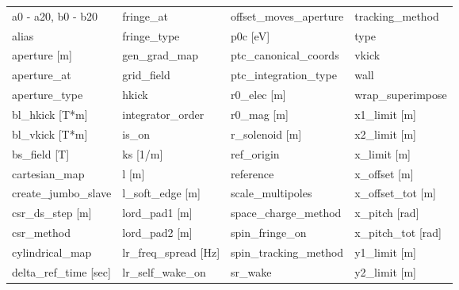  \begin{tabular}{llll} \toprule
a0 - a20, b0 - b20               & fringe_at                        & offset_moves_aperture            & tracking_method                  \\
alias                            & fringe_type                      & p0c [eV]                         & type                             \\
aperture [m]                     & gen_grad_map                     & ptc_canonical_coords             & vkick                            \\
aperture_at                      & grid_field                       & ptc_integration_type             & wall                             \\
aperture_type                    & hkick                            & r0_elec [m]                      & wrap_superimpose                 \\
bl_hkick [T*m]                   & integrator_order                 & r0_mag [m]                       & x1_limit [m]                     \\
bl_vkick [T*m]                   & is_on                            & r_solenoid [m]                   & x2_limit [m]                     \\
bs_field [T]                     & ks [1/m]                         & ref_origin                       & x_limit [m]                      \\
cartesian_map                    & l [m]                            & reference                        & x_offset [m]                     \\
create_jumbo_slave               & l_soft_edge [m]                  & scale_multipoles                 & x_offset_tot [m]                 \\
csr_ds_step [m]                  & lord_pad1 [m]                    & space_charge_method              & x_pitch [rad]                    \\
csr_method                       & lord_pad2 [m]                    & spin_fringe_on                   & x_pitch_tot [rad]                \\
cylindrical_map                  & lr_freq_spread [Hz]              & spin_tracking_method             & y1_limit [m]                     \\
delta_ref_time [sec]             & lr_self_wake_on                  & sr_wake                          & y2_limit [m]                     \\

\end{tabular}
